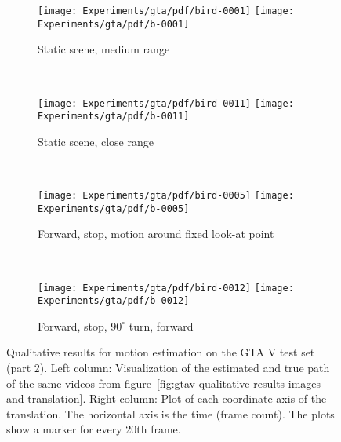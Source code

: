 		
		\begin{figure}[h]
			\centering
			\begin{subfigure}[b]{\linewidth}
				\centering
				\texttt{[image: Experiments/gta/pdf/bird-0001]}
				\texttt{[image: Experiments/gta/pdf/b-0001]}
				\caption{
					Static scene, medium range
					\label{fig:gtav-qualitative-long-range}
				}
			\end{subfigure}%
			\\
			\begin{subfigure}[b]{\linewidth}
				\centering
				\texttt{[image: Experiments/gta/pdf/bird-0011]}
				\texttt{[image: Experiments/gta/pdf/b-0011]}
				\caption{
					Static scene, close range
					\label{fig:gtav-qualitative-close-range}
				}
			\end{subfigure}%
			\\
			\begin{subfigure}[b]{\linewidth}
				\centering
				\texttt{[image: Experiments/gta/pdf/bird-0005]}
				\texttt{[image: Experiments/gta/pdf/b-0005]}
				\caption{
					Forward, stop, motion around fixed look-at point
					\label{fig:gtav-qualitative-look-at-fixed}
				}
			\end{subfigure}%
			\\
			\begin{subfigure}[b]{\linewidth}
				\centering
				\texttt{[image: Experiments/gta/pdf/bird-0012]}
				\texttt{[image: Experiments/gta/pdf/b-0012]}
				\caption{
					Forward, stop, $90^\circ$ turn, forward
					\label{fig:gtav-qualitative-sharp-turn}
				}
			\end{subfigure}%
			\caption[Qualitative results for motion estimation on GTA V - Part 2]
					{Qualitative results for motion estimation on the GTA V test set (part 2).
					 Left column: Visualization of the estimated and true path of the same videos from figure~\ref{fig:gtav-qualitative-results-images-and-translation}.
					 Right column: Plot of each coordinate axis of the translation.
					 The horizontal axis is the time (frame count).
					 The plots show a marker for every 20th frame.
					 \label{fig:gtav-qualitative-results-translation}}
		\end{figure}